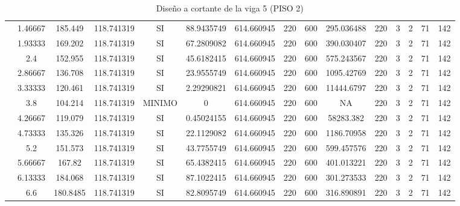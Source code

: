 \begin{table}[H]
{\begin{tabular}{|c|c|c|c|c|c|c|c|c|c|c|c|c|c|c|}
\cline{2-15}    & 1.46667 & 185.449 & 118.741319 & SI  & 88.9435749 & 614.660945 & 220 & 600 & 295.036488 & 220 & 3   & 2   & 71  & 142 \bigstrut\\
\cline{2-15}    & 1.93333 & 169.202 & 118.741319 & SI  & 67.2809082 & 614.660945 & 220 & 600 & 390.030407 & 220 & 3   & 2   & 71  & 142 \bigstrut\\
\cline{2-15}    & 2.4 & 152.955 & 118.741319 & SI  & 45.6182415 & 614.660945 & 220 & 600 & 575.243567 & 220 & 3   & 2   & 71  & 142 \bigstrut\\
\cline{2-15}    & 2.86667 & 136.708 & 118.741319 & SI  & 23.9555749 & 614.660945 & 220 & 600 & 1095.42769 & 220 & 3   & 2   & 71  & 142 \bigstrut\\
\cline{2-15}    & 3.33333 & 120.461 & 118.741319 & SI  & 2.29290821 & 614.660945 & 220 & 600 & 11444.6797 & 220 & 3   & 2   & 71  & 142 \bigstrut\\
\cline{2-15}    & 3.8 & 104.214 & 118.741319 & MINIMO & 0   & 614.660945 & 220 & 600 & NA  & 220 & 3   & 2   & 71  & 142 \bigstrut\\
\cline{2-15}    & 4.26667 & 119.079 & 118.741319 & SI  & 0.45024155 & 614.660945 & 220 & 600 & 58283.382 & 220 & 3   & 2   & 71  & 142 \bigstrut\\
\cline{2-15}    & 4.73333 & 135.326 & 118.741319 & SI  & 22.1129082 & 614.660945 & 220 & 600 & 1186.70958 & 220 & 3   & 2   & 71  & 142 \bigstrut\\
\cline{2-15}    & 5.2 & 151.573 & 118.741319 & SI  & 43.7755749 & 614.660945 & 220 & 600 & 599.457576 & 220 & 3   & 2   & 71  & 142 \bigstrut\\
\cline{2-15}    & 5.66667 & 167.82 & 118.741319 & SI  & 65.4382415 & 614.660945 & 220 & 600 & 401.013221 & 220 & 3   & 2   & 71  & 142 \bigstrut\\
\cline{2-15}    & 6.13333 & 184.068 & 118.741319 & SI  & 87.1022415 & 614.660945 & 220 & 600 & 301.273533 & 220 & 3   & 2   & 71  & 142 \bigstrut\\
\cline{2-15}    & 6.6 & 180.8485 & 118.741319 & SI  & 82.8095749 & 614.660945 & 220 & 600 & 316.890891 & 220 & 3   & 2   & 71  & 142 \bigstrut\\
\hline
\end{tabular}%

  }%
    \caption{Diseño a cortante de la viga 5 (PISO 2) }
  \label{tab:C VG5 P2 }%
\end{table}%

